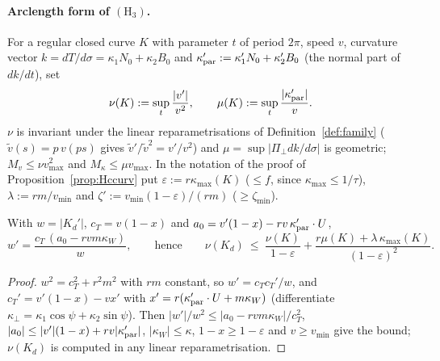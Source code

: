 
\paragraph{Arclength form of $(\mathrm H_3)$.} For a regular closed curve $K$ with parameter $t$ of period $2\pi$, speed $v$, curvature vector $k=dT/d\sigma=\kappa_1N_0+\kappa_2B_0$ and $\kappa_{\rm par}':=\kappa_1'N_0+\kappa_2'B_0$ (the normal part of $dk/dt$), set
\[
\nu(K):=\sup_t\frac{|v'|}{v^2},\qquad \mu(K):=\sup_t\frac{|\kappa_{\rm par}'|}{v}.
\]
$\nu$ is invariant under the linear reparametrisations of Definition~\ref{def:family} ($\tilde v(s)=p\,v(ps)$ gives $\tilde v'/\tilde v^2=v'/v^2$) and $\mu=\sup|\Pi_\perp dk/d\sigma|$ is geometric; $M_v\le\nu v_{\max}^2$ and $M_\kappa\le\mu v_{\max}$. In the notation of the proof of Proposition~\ref{prop:Hccurv} put $\varepsilon:=r\kappa_{\max}(K)$ ($\le f$, since $\kappa_{\max}\le1/\tau$), $\lambda:=rm/v_{\min}$ and $\zeta':=v_{\min}(1-\varepsilon)/(rm)$ ($\ge\zeta_{\min}$).

\begin{lemma}[speed of $K_d$]\label{lem:speedrec}
With $w=|K_d'|$, $c_T=v(1-x)$ and $a_0=v'(1-x)-rv\,\kappa_{\rm par}'\cdot U$,
\begin{equation}\label{eq:wprime}
w'=\frac{c_T\,(a_0-rvm\kappa_W)}{w},
\qquad\text{hence}\qquad
\nu(K_d)\ \le\ \frac{\nu(K)}{1-\varepsilon}+\frac{r\mu(K)+\lambda\,\kappa_{\max}(K)}{(1-\varepsilon)^2}.
\end{equation}
\end{lemma}
\begin{proof}
$w^2=c_T^2+r^2m^2$ with $rm$ constant, so $w'=c_Tc_T'/w$, and $c_T'=v'(1-x)-vx'$ with $x'=r(\kappa_{\rm par}'\cdot U+m\kappa_W)$ (differentiate $\kappa_\perp=\kappa_1\cos\psi+\kappa_2\sin\psi$). Then $|w'|/w^2\le|a_0-rvm\kappa_W|/c_T^2$, $|a_0|\le|v'|(1-x)+rv|\kappa_{\rm par}'|$, $|\kappa_W|\le\kappa$, $1-x\ge1-\varepsilon$ and $v\ge v_{\min}$ give the bound; $\nu(K_d)$ is computed in any linear reparametrisation.
\end{proof}


